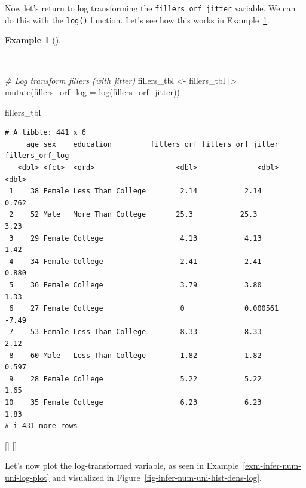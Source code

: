 \documentclass[
  letterpaper,
  krantz1]{latex/krantz-mod}
\newenvironment{Shaded}{\begin{snugshade}}{\end{snugshade}}
\newcommand{\AttributeTok}[1]{\textcolor[rgb]{0.00,0.00,0.00}{#1}}
\newcommand{\CommentTok}[1]{\textcolor[rgb]{0.00,0.00,0.00}{\textit{#1}}}
\newcommand{\FunctionTok}[1]{\textcolor[rgb]{0.00,0.00,0.00}{#1}}
\newcommand{\NormalTok}[1]{\textcolor[rgb]{0.00,0.00,0.00}{#1}}
\newcommand{\OtherTok}[1]{\textcolor[rgb]{0.00,0.00,0.00}{#1}}
\newcommand{\SpecialCharTok}[1]{\textcolor[rgb]{0.00,0.00,0.00}{#1}}
\newcommand{\cindex}[1]{%
  \StrSubstitute{#1}{_}{\_}[\temp]%
  \index{\temp}%
}
\theoremstyle{definition}
\theoremstyle{definition}
\newtheorem{example}{Example}[chapter]
\theoremstyle{remark}
\begin{document}
Now let's return to log transforming the \texttt{fillers\_orf\_jitter}
variable. We can do this with the \texttt{log()} function. Let's see how
this works in Example~\ref{exm-infer-num-uni-log}.

\begin{example}[]\protect\hypertarget{exm-infer-num-uni-log}{}\label{exm-infer-num-uni-log}

~

\begin{Shaded}
\begin{Highlighting}[numbers=left,,]
\CommentTok{\# Log transform fillers (with jitter)}
\NormalTok{fillers\_tbl }\OtherTok{\textless{}{-}}
\NormalTok{  fillers\_tbl }\SpecialCharTok{|\textgreater{}}
  \FunctionTok{mutate}\NormalTok{(}\AttributeTok{fillers\_orf\_log =} \FunctionTok{log}\NormalTok{(fillers\_orf\_jitter))}

\NormalTok{fillers\_tbl}
\end{Highlighting}
\end{Shaded}

\begin{verbatim}
# A tibble: 441 x 6
     age sex    education         fillers_orf fillers_orf_jitter fillers_orf_log
   <dbl> <fct>  <ord>                   <dbl>              <dbl>           <dbl>
 1    38 Female Less Than College        2.14           2.14               0.762
 2    52 Male   More Than College       25.3           25.3                3.23 
 3    29 Female College                  4.13           4.13               1.42 
 4    34 Female College                  2.41           2.41               0.880
 5    36 Female College                  3.79           3.80               1.33 
 6    27 Female College                  0              0.000561          -7.49 
 7    53 Female Less Than College        8.33           8.33               2.12 
 8    60 Male   Less Than College        1.82           1.82               0.597
 9    28 Female College                  5.22           5.22               1.65 
10    35 Female College                  6.23           6.23               1.83 
# i 431 more rows
\end{verbatim}

 \cindex{mutate()}\cindex{log()}

\end{example}

Let's now plot the log-transformed variable, as seen in
Example~\ref{exm-infer-num-uni-log-plot} and
visualized in Figure~\ref{fig-infer-num-uni-hist-dens-log}.
\end{document}
